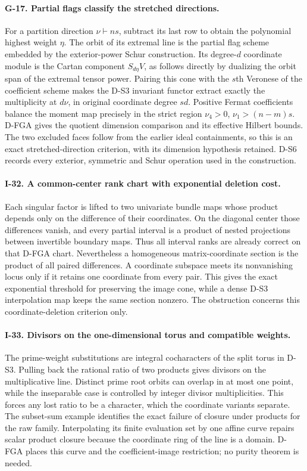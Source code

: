 \documentclass[11pt,a4paper]{article}
\theoremstyle{definition}\newtheorem{definition}{Definition}
\begin{document}
\paragraph{G-17. Partial flags classify the stretched directions.}
For a partition direction $\nu\vdash ns$, subtract its last row to
obtain the polynomial highest weight $\eta$. The orbit of its extremal
line is the partial flag scheme embedded by the exterior-power Schur
construction. Its degree-$d$ coordinate module is the Cartan component
$S_{d\eta}V$, as follows directly by dualizing the orbit span of the
extremal tensor power. Pairing this cone with the $s$th Veronese of the
coefficient scheme makes the D-S3 invariant functor extract exactly
the multiplicity at $d\nu$, in original coordinate degree $sd$.
Positive Fermat coefficients balance the moment map precisely in the
strict region $\nu_4>0$, $\nu_1>(n-m)s$. D-FGA gives the quotient
dimension comparison and its effective Hilbert bounds. The two
excluded faces follow from the earlier ideal containments, so this
is an exact stretched-direction criterion, with its dimension
hypothesis retained. D-S6 records every exterior, symmetric and Schur
operation used in the construction.

\paragraph{I-32. A common-center rank chart with exponential deletion cost.}
Each singular factor is lifted to two univariate bundle maps whose
product depends only on the difference of their coordinates. On the
diagonal center those differences vanish, and every partial interval
is a product of nested projections between invertible boundary maps.
Thus all interval ranks are already correct on that D-FGA chart.
Nevertheless a homogeneous matrix-coordinate section is the product
of all paired differences. A coordinate subspace meets its nonvanishing
locus only if it retains one coordinate from every pair. This gives
the exact exponential threshold for preserving the image cone, while
a dense D-S3 interpolation map keeps the same section nonzero. The
obstruction concerns this coordinate-deletion criterion only.

\paragraph{I-33. Divisors on the one-dimensional torus and compatible weights.}
The prime-weight substitutions are integral cocharacters of the
split torus in D-S3. Pulling back the rational ratio of two products
gives divisors on the multiplicative line. Distinct prime root orbits
can overlap in at most one point, while the inseparable case is
controlled by integer divisor multiplicities. This forces any lost
ratio to be a character, which the coordinate variants separate.
The subset-sum example identifies the exact failure of closure under
products for the raw family. Interpolating its finite evaluation set
by one affine curve repairs scalar product closure because the
coordinate ring of the line is a domain. D-FGA places this curve and
the coefficient-image restriction; no purity theorem is needed.
\end{document}
